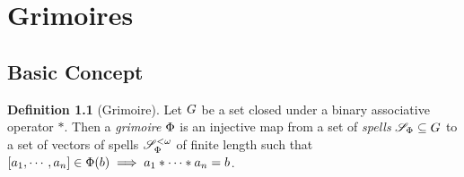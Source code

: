 \documentclass[a4paper,twoside,12pt,openany]{report}
\theoremstyle{plain}
\theoremstyle{definition}
\newtheorem{definition}{Definition}
\newtheorem{example}{Example}
\theoremstyle{remark}
\begin{document}

\chapter{Grimoires}
\section{Basic Concept}

\begin{definition}[Grimoire]
	Let \(G\) be a set closed under a binary associative operator \(*\). Then a \emph{grimoire} \(\Phi\) is an injective map from a set of \textit{spells} \(\mathscr{S}_{\Phi}\subseteq G\) to a set of vectors of spells \(\mathscr{S}_{\Phi}^{<\omega}\) of finite length such that \(\left[ a_1,\cdots,a_n \right]\in\Phi(b) \implies a_1*\cdots*a_n = b\).
\end{definition}
\end{document}

